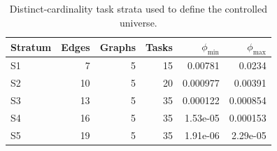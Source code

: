
\begin{table}[ht]
\centering
\caption{Distinct-cardinality task strata used to define the controlled universe.}
\label{tab:task-strata}
\small
\begin{tabular}{@{}lrrrrr@{}}
\toprule
Stratum & Edges & Graphs & Tasks & $\phi_{\min}$ & $\phi_{\max}$ \\
\midrule
S1 & 7 & 5 & 15 & 0.00781 & 0.0234 \\
S2 & 10 & 5 & 20 & 0.000977 & 0.00391 \\
S3 & 13 & 5 & 35 & 0.000122 & 0.000854 \\
S4 & 16 & 5 & 35 & 1.53e-05 & 0.000153 \\
S5 & 19 & 5 & 35 & 1.91e-06 & 2.29e-05 \\
\bottomrule
\end{tabular}
\end{table}
